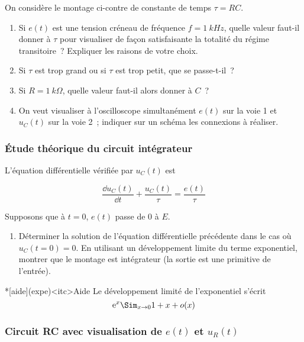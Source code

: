 \documentclass[../main/main.tex]{subfiles}
\begin{document}
On considère le montage ci-contre de constante de temps $\tau = RC$.

\begin{enumerate}
	\item Si $e(t)$ est une tension créneau de fréquence $f = \SI{1}{kHz}$,
	      quelle valeur faut-il donner à $\tau$ pour visualiser de façon
	      satisfaisante la totalité du régime transitoire~? Expliquer les raisons
	      de votre choix.
	\item Si $\tau$ est trop grand ou si $\tau$ est trop petit, que se
	      passe-t-il~?
	\item Si $R = \SI{1}{k\Omega}$, quelle valeur faut-il alors donner à $C$~?
	\item On veut visualiser à l'oscilloscope simultanément $e(t)$ sur la voie 1
	      et $u_{C}(t)$ sur la voie 2~; indiquer sur un schéma les connexions à
	      réaliser.
\end{enumerate}

\subsubsection{Étude théorique du circuit intégrateur}

L'équation différentielle vérifiée par $u_{C}(t)$ est

\[\frac{\dd u_{C}(t)}{\dd t} + \frac{u_{C}(t)}{\tau} = \frac{e(t)}{\tau}\]

Supposons que à $t=0$, $e(t)$ passe de $0$ à $E$.

\begin{enumerate}[resume]
	\item Déterminer la solution de l'équation différentielle précédente dans
	      le cas où $u_{C}(t=0) = 0$. En utilisant un développement limite du
	      terme exponentiel, montrer que le montage est intégrateur (la sortie est
	      une primitive de l'entrée).
\end{enumerate}

\medskip

\begin{tcb}*[aide](expe)<itc>{Aide}
	Le développement limité de l'exponentiel s'écrit
	\[\text{e}^x \Sim_{x \to 0} 1+x + o(x)\]
\end{tcb}

\subsubsection{Circuit RC avec visualisation de $e(t)$ et $u_{R}(t)$}
\end{document}
